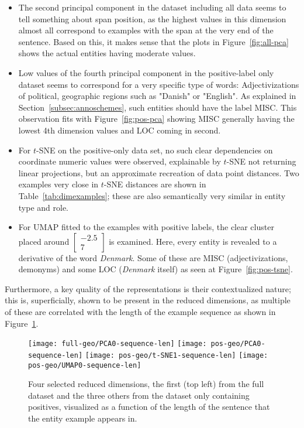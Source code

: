 \documentclass[main.tex]{subfiles}
\begin{document}
\begin{itemize}
    \item 
        The second principal component in the dataset including all data seems to tell something about span position, as the highest values in this dimension almost all correspond to examples with the span at the very end of the sentence.
        Based on this, it makes sense that the plots in Figure~\ref{fig:all-pca} shows the actual entities having moderate values.
    \item 
        Low values of the fourth principal component in the positive-label only dataset seems to correspond for a very specific type of words:
        Adjectivizations of political, geographic regions such as "Danish" or "English".
        As explained in Section~\ref{subsec:annoschemes}, such entities should have the label MISC.
        This observation fits with Figure~\ref{fig:pos-pca} showing MISC generally having the lowest 4th dimension values and LOC coming in second.
    \item 
        For $t$-SNE on the positive-only data set, no such clear dependencies on coordinate numeric values were observed, explainable by $t$-SNE not returning linear projections, but an approximate recreation of data point distances.
        Two examples very close in $t$-SNE distances are shown in Table~\ref{tab:dimexamples}; these are also semantically very similar in entity type and role.
    \item 
        For UMAP fitted to the examples with positive labels, the clear cluster placed around $\begin{bmatrix} -2.5\\ 7\end{bmatrix}$ is examined.
        Here, every entity is revealed to a derivative of the word \emph{Denmark}.
        Some of these are MISC (adjectivizations, demonyms) and some LOC (\emph{Denmark} itself) as seen at Figure~\ref{fig:pos-tsne}.
\end{itemize}
Furthermore, a key quality of the representations is their contextualized nature; this is, superficially, shown to be present in the reduced dimensions, as multiple of these are correlated with the length of the example sequence as shown in Figure~\ref{fig:repvslen}.

\begin{figure}[H]
    \centering
        \texttt{[image: full-geo/PCA0-sequence-len]}
        \texttt{[image: pos-geo/PCA0-sequence-len]}
        \texttt{[image: pos-geo/t-SNE1-sequence-len]}
        \texttt{[image: pos-geo/UMAP0-sequence-len]}
     \caption{
        Four selected reduced dimensions, the first (top left) from the full dataset and the three others from the dataset only containing positives, visualized as a function of the length of the sentence that the entity example appears in.
    }
    \label{fig:repvslen}
\end{figure}\noindent
\end{document}
